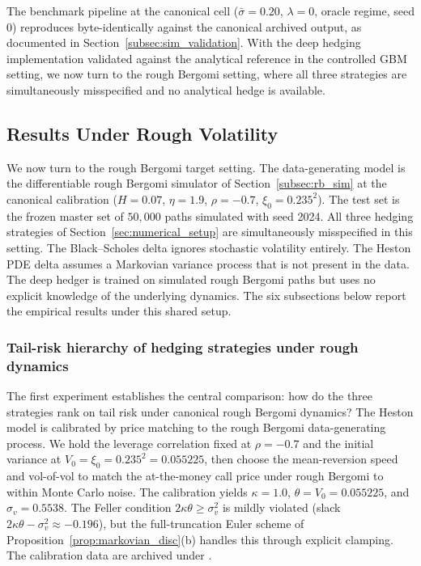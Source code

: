 \documentclass[12pt,a4paper]{article}
\theoremstyle{definition}
\theoremstyle{plain}
\theoremstyle{remark}
\theoremstyle{plain}
\begin{document}
The benchmark pipeline at the canonical cell
($\bar\sigma = 0.20$, $\lambda = 0$, oracle regime, seed $0$) reproduces
byte-identically against the canonical archived output, as documented
in Section~\ref{subsec:sim_validation}. With the deep hedging
implementation validated against the analytical reference in the
controlled GBM setting, we now turn to the rough Bergomi setting, where
all three strategies are simultaneously misspecified and no analytical
hedge is available.

\subsection{Results Under Rough Volatility}
\label{subsec:results_rough_vol}

We now turn to the rough Bergomi target setting. The data-generating
model is the differentiable rough Bergomi simulator of
Section~\ref{subsec:rb_sim} at the canonical calibration ($H = 0.07$,
$\eta = 1.9$, $\rho = -0.7$, $\xi_0 = 0.235^2$). The test set is the
frozen master set of $50{,}000$ paths simulated with seed 2024. All
three hedging strategies of Section~\ref{sec:numerical_setup} are
simultaneously misspecified in this setting. The Black--Scholes delta
ignores stochastic volatility entirely. The Heston PDE delta assumes a
Markovian variance process that is not present in the data. The deep
hedger is trained on simulated rough Bergomi paths but uses no explicit
knowledge of the underlying dynamics. The six subsections below report
the empirical results under this shared setup.

\subsubsection{Tail-risk hierarchy of hedging strategies under rough dynamics}
\label{sec:6_3_1}

The first experiment establishes the central comparison: how do the
three strategies rank on tail risk under canonical rough Bergomi
dynamics? The Heston model is calibrated by price matching to the
rough Bergomi data-generating process. We hold the leverage correlation
fixed at $\rho = -0.7$ and the initial variance at $V_0 = \xi_0 =
0.235^2 = 0.055225$, then choose the mean-reversion speed and
vol-of-vol to match the at-the-money call price under rough Bergomi to
within Monte Carlo noise. The calibration yields $\kappa = 1.0$,
$\theta = V_0 = 0.055225$, and $\sigma_v = 0.5538$. The Feller
condition $2\kappa\theta \geq \sigma_v^2$ is mildly violated (slack
$2\kappa\theta - \sigma_v^2 \approx -0.196$), but the full-truncation
Euler scheme of Proposition~\ref{prop:markovian_disc}(b) handles this
through explicit clamping. The calibration data are archived under
.
\end{document}
